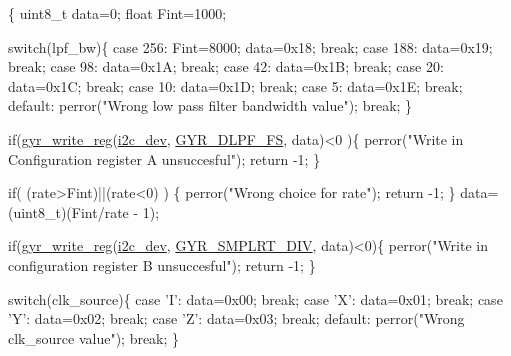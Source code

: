 \begin{DoxyCode}
\{ 
  uint8\_t data=0;
  \textcolor{keywordtype}{float} Fint=1000;

  \textcolor{keywordflow}{switch}(lpf\_bw)\{
    \textcolor{keywordflow}{case} 256:
      Fint=8000;
      data=0x18;
      \textcolor{keywordflow}{break};
    \textcolor{keywordflow}{case} 188:
      data=0x19;
      \textcolor{keywordflow}{break};
    \textcolor{keywordflow}{case} 98:
      data=0x1A;
      \textcolor{keywordflow}{break};
    \textcolor{keywordflow}{case} 42:
      data=0x1B;
      \textcolor{keywordflow}{break};
    \textcolor{keywordflow}{case} 20:
      data=0x1C;
      \textcolor{keywordflow}{break};
    \textcolor{keywordflow}{case} 10:
      data=0x1D;
      \textcolor{keywordflow}{break};
    \textcolor{keywordflow}{case} 5:
      data=0x1E;
      \textcolor{keywordflow}{break};
    \textcolor{keywordflow}{default}:
      perror(\textcolor{stringliteral}{"Wrong low pass filter bandwidth value"});
      \textcolor{keywordflow}{break};
  \}
  
  \textcolor{keywordflow}{if}(\hyperlink{group__gyr_ga3eba167b8ab0614bfe7bafeae8b5570d}{gyr\_write\_reg}(\hyperlink{CommunicationV0_2communication_8c_a7751bd45ac1064efb35adf1f19c25db8}{i2c\_dev}, \hyperlink{communication_2imu__regs_8h_a78908b66de8b46d12895e7cb66af6f5c}{GYR\_DLPF\_FS}, data)<0
      )\{
    perror(\textcolor{stringliteral}{"Write in Configuration register A unsuccesful"});
    \textcolor{keywordflow}{return} -1;
  \}

  \textcolor{keywordflow}{if}( (rate>Fint)||(rate<0) )
  \{
    perror(\textcolor{stringliteral}{"Wrong choice for rate"});
    \textcolor{keywordflow}{return} -1;
  \}
  data=(uint8\_t)(Fint/rate - 1);
  
  \textcolor{keywordflow}{if}(\hyperlink{group__gyr_ga3eba167b8ab0614bfe7bafeae8b5570d}{gyr\_write\_reg}(\hyperlink{CommunicationV0_2communication_8c_a7751bd45ac1064efb35adf1f19c25db8}{i2c\_dev}, \hyperlink{communication_2imu__regs_8h_a04a18568e6e39825c98be5ec2976bec4}{GYR\_SMPLRT\_DIV}, 
      data)<0)\{
    perror(\textcolor{stringliteral}{"Write in configuration register B unsuccesful"});
    \textcolor{keywordflow}{return} -1;
  \}
      
  \textcolor{keywordflow}{switch}(clk\_source)\{
    \textcolor{keywordflow}{case} \textcolor{charliteral}{'I'}:
      data=0x00;
      \textcolor{keywordflow}{break};
    \textcolor{keywordflow}{case} \textcolor{charliteral}{'X'}:
      data=0x01;
      \textcolor{keywordflow}{break};
    \textcolor{keywordflow}{case} \textcolor{charliteral}{'Y'}:
      data=0x02;
      \textcolor{keywordflow}{break};
    \textcolor{keywordflow}{case} \textcolor{charliteral}{'Z'}:
      data=0x03;
      \textcolor{keywordflow}{break};
    \textcolor{keywordflow}{default}:
      perror(\textcolor{stringliteral}{"Wrong clk\_source value"});
      \textcolor{keywordflow}{break};
  \}
      

\end{DoxyCode}
